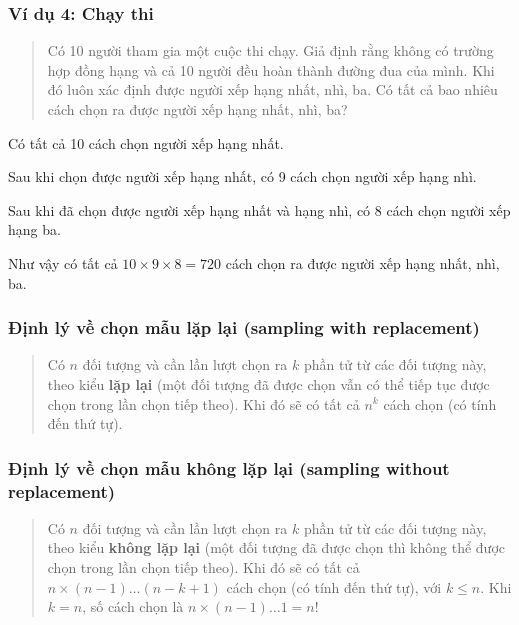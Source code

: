 \documentclass[
]{book}
\begin{document}
\hypertarget{vuxed-dux1ee5-4-chux1ea1y-thi}{%
\subsubsection{Ví dụ 4: Chạy thi}\label{vuxed-dux1ee5-4-chux1ea1y-thi}}

\begin{quote}
Có 10 người tham gia một cuộc thi chạy. Giả định rằng không có trường hợp đồng hạng và cả 10 người đều hoàn thành đường đua của mình. Khi đó luôn xác định được người xếp hạng nhất, nhì, ba. Có tất cả bao nhiêu cách chọn ra được người xếp hạng nhất, nhì, ba?
\end{quote}

Có tất cả 10 cách chọn người xếp hạng nhất.

Sau khi chọn được người xếp hạng nhất, có 9 cách chọn người xếp hạng nhì.

Sau khi đã chọn được người xếp hạng nhất và hạng nhì, có 8 cách chọn người xếp hạng ba.

Như vậy có tất cả \(10 \times 9 \times 8 = 720\) cách chọn ra được người xếp hạng nhất, nhì, ba.

\hypertarget{ux111ux1ecbnh-luxfd-vux1ec1-chux1ecdn-mux1eabu-lux1eb7p-lux1ea1i-sampling-with-replacement}{%
\subsubsection{Định lý về chọn mẫu lặp lại (sampling with replacement)}\label{ux111ux1ecbnh-luxfd-vux1ec1-chux1ecdn-mux1eabu-lux1eb7p-lux1ea1i-sampling-with-replacement}}

\begin{quote}
Có \(n\) đối tượng và cần lần lượt chọn ra \(k\) phần tử từ các đối tượng này, theo kiểu \textbf{lặp lại} (một đối tượng đã được chọn vẫn có thể tiếp tục được chọn trong lần chọn tiếp theo). Khi đó sẽ có tất cả \(n^k\) cách chọn (có tính đến thứ tự).
\end{quote}

\hypertarget{ux111ux1ecbnh-luxfd-vux1ec1-chux1ecdn-mux1eabu-khuxf4ng-lux1eb7p-lux1ea1i-sampling-without-replacement}{%
\subsubsection{Định lý về chọn mẫu không lặp lại (sampling without replacement)}\label{ux111ux1ecbnh-luxfd-vux1ec1-chux1ecdn-mux1eabu-khuxf4ng-lux1eb7p-lux1ea1i-sampling-without-replacement}}

\begin{quote}
Có \(n\) đối tượng và cần lần lượt chọn ra \(k\) phần tử từ các đối tượng này, theo kiểu \textbf{không lặp lại} (một đối tượng đã được chọn thì không thể được chọn trong lần chọn tiếp theo). Khi đó sẽ có tất cả \(n \times (n-1) \ldots (n-k+1)\) cách chọn (có tính đến thứ tự), với \(k \leq n\). Khi \(k=n\), số cách chọn là \(n \times (n-1) \ldots 1 = n!\)
\end{quote}
\end{document}
